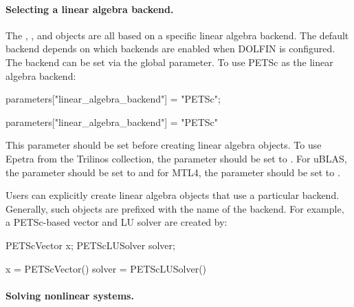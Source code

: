 \paragraph{Selecting a linear algebra backend.}


The , ,  and 
objects are all based on a specific linear algebra backend.
The default backend depends on which backends are enabled when DOLFIN
is configured.  The backend can be set via the global
parameter\break {}.  To use PETSc as the linear
algebra backend:
\begin{c++}
parameters["linear_algebra_backend"] = "PETSc";
\end{c++}
\begin{python}
parameters["linear_algebra_backend"] = "PETSc"
\end{python}
This parameter should be set before creating linear algebra
objects. To use Epetra from the Trilinos collection, the parameter
 should be set to .
For uBLAS, the parameter should be set to  and for MTL4, the
parameter should be set to .

Users can explicitly create linear algebra objects that use a
particular backend. Generally, such objects are prefixed with the name
of the backend. For example, a PETSc-based vector and LU solver are
created by:
\begin{c++}
PETScVector x;
PETScLUSolver solver;
\end{c++}
\begin{python}
x = PETScVector()
solver = PETScLUSolver()
\end{python}

\paragraph{Solving nonlinear systems.}

